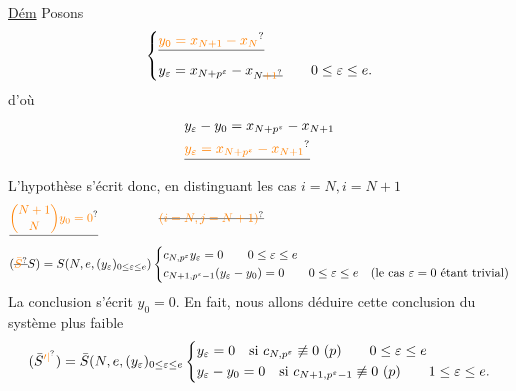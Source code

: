\uline{Dém} Posons
\[
\left\{\begin{aligned}
&\deleted{\unsure{y_0=x_{N+1}-x_N}}\\
&y_\varepsilon=x_{N+p^\varepsilon}-x_{N\deleted{\unsure{+1}}}\qquad 0\leq\varepsilon\leq e.
\end{aligned}\right.
\]
d'où
\[
\begin{aligned}
&y_\varepsilon-y_0=x_{N+p^\varepsilon}-x_{N+1}\\
&\deleted{\unsure{y_\varepsilon=x_{N+p^\varepsilon}-x_{N+1}}}
\end{aligned}
\]
L'hypothèse s'écrit donc, en distinguant les cas $i=N,i=N+1$
\[
\begin{aligned}
&\deleted{\unsure{\binom{N+1}{N}y_0=0}}\hspace{5em}\deleted{\unsure{(i=N,j=N+1)}}\\
&(\deleted{\unsure{\bar S}}S)=S(N,e,(y_\varepsilon)_{0\leq\varepsilon\leq e})\left\{\begin{aligned}
&c_{N,p^\varepsilon}y_\varepsilon=0\qquad 0\leq\varepsilon\leq e\\
&c_{N+1,p^\varepsilon-1}(y_\varepsilon-y_0)=0\qquad 0\leq\varepsilon\leq e\quad\text{(le cas $\varepsilon=0$ étant trivial)}
\end{aligned}\right.
\end{aligned}
\]
La conclusion s'écrit $y_0=0$. En fait, nous allons déduire cette conclusion du système plus faible 
\[
(\bar S^{\unsure{\prime|{}}})=\bar S(N,e,(y_\varepsilon)_{0\leq\varepsilon\leq e}\left\{\begin{aligned}
&y_\varepsilon=0\quad\text{si }c_{N,p^\varepsilon}\not\equiv0\ (p)\qquad 0\leq\varepsilon\leq e\\
&y_\varepsilon-y_0=0\quad\text{si }c_{N+1,p^\varepsilon-1}\not\equiv0\ (p)\qquad 1\leq\varepsilon\leq e.
\end{aligned}\right.
\]

